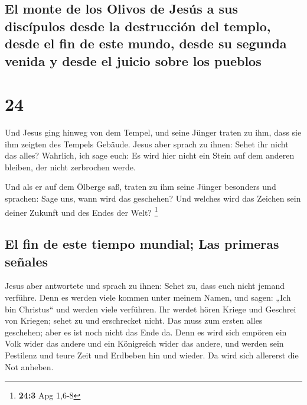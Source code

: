 \hypertarget{el-monte-de-los-olivos-de-jesuxfas-a-sus-discuxedpulos-desde-la-destrucciuxf3n-del-templo-desde-el-fin-de-este-mundo-desde-su-segunda-venida-y-desde-el-juicio-sobre-los-pueblos}{%
\subsection{El monte de los Olivos de Jesús a sus discípulos desde la
destrucción del templo, desde el fin de este mundo, desde su segunda
venida y desde el juicio sobre los
pueblos}\label{el-monte-de-los-olivos-de-jesuxfas-a-sus-discuxedpulos-desde-la-destrucciuxf3n-del-templo-desde-el-fin-de-este-mundo-desde-su-segunda-venida-y-desde-el-juicio-sobre-los-pueblos}}

\hypertarget{section-23}{%
\section{24}\label{section-23}}

 Und Jesus ging hinweg von dem Tempel, und seine Jünger
traten zu ihm, dass sie ihm zeigten des Tempels Gebäude. 
Jesus aber sprach zu ihnen: Sehet ihr nicht das alles? Wahrlich, ich
sage euch: Es wird hier nicht ein Stein auf dem anderen bleiben, der
nicht zerbrochen werde.

 Und als er auf dem Ölberge saß, traten zu ihm seine
Jünger besonders und sprachen: Sage uns, wann wird das geschehen? Und
welches wird das Zeichen sein deiner Zukunft und des Endes der Welt?
\footnote{\textbf{24:3} Apg 1,6-8}

\hypertarget{el-fin-de-este-tiempo-mundial-las-primeras-seuxf1ales}{%
\subsection{El fin de este tiempo mundial; Las primeras
señales}\label{el-fin-de-este-tiempo-mundial-las-primeras-seuxf1ales}}

 Jesus aber antwortete und sprach zu ihnen: Sehet zu, dass
euch nicht jemand verführe.  Denn es werden viele kommen
unter meinem Namen, und sagen: „Ich bin Christus`` und werden viele
verführen.  Ihr werdet hören Kriege und Geschrei von
Kriegen; sehet zu und erschrecket nicht. Das muss zum ersten alles
geschehen; aber es ist noch nicht das Ende da.  Denn es
wird sich empören ein Volk wider das andere und ein Königreich wider das
andere, und werden sein Pestilenz und teure Zeit und Erdbeben hin und
wieder.  Da wird sich allererst die Not anheben.

